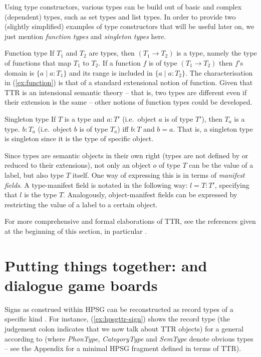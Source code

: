 \documentclass[output=paper
	        ,collection
	        ,collectionchapter
 	        ,biblatex
                ,babelshorthands
                ,newtxmath
                ,draftmode
                ,colorlinks, citecolor=brown
]{langscibook}
\begin{document}
Using type constructors, various types can be build out of basic and complex (dependent) types, such as set types and list types. 
%
In order to provide two (slightly simplified) examples of type constructors that will be useful later on, we just mention \emph{function types}  and \emph{singleton types}  here.

\ea Function type \label{ex:function}
\ea If $T_1$ and $T_2$ are types, then $(T_1 \rightarrow T_2)$ is a type, namely the type of functions that map $T_1$ to $T_2$.
\ex If a function $f$ is of type $(T_1 \rightarrow T_2)$ then $f$'s domain is $\{a \mid a : T_1\}$ and its range is included in $\{a \mid a : T_2\}$.
\z
\z 
%
The characterisation in (\ref{ex:function}) is that of a standard extensional notion of function. 
%
Given that TTR is an intensional semantic theory -- that is, two types are different even if their extension is the same -- other notions of function types could be developed.


\ea Singleton type
\ea If $T$ is a type and $a : T'$ (i.e.\ object $a$ is of type $T'$), then $T_a$ is a type.
\ex $b : T_a$ (i.e.\ object $b$ is of type $T_a$) iff $b : T$ and $b = a$.
\z
\z
%
That is, a singleton type is singleton since it is the type of specific object. 

Since types are semantic objects in their own right (types are not defined by or reduced to their extensions), not only an object $o$ of type $T$ can be the value of a label, but also  type $T$ itself.
%
One way of expressing this is in terms of 
\emph{manifest fields}. 
%
A type-manifest field is notated in the following way: $l=T : T'$, specifying that $l$ is the type $T$.
%
Analogously, object-manifest fields can be expressed by restricting the value of a label to a certain object.


For more comprehensive and formal elaborations of TTR, see the references given at the beginning of this section, in particular \citet{Cooper:ms}.
  



 
\section{Putting things together: \HPSGTTR and dialogue game boards}
\label{sec:hpsgttr-dialogue-game-boards}

Signs as construed within HPSG can be reconstructed as record types of a specific kind \citep{Cooper:2008}.
%
For instance, (\ref{ex:hpsgttr-sign}) shows the record type (the judgement colon indicates that we now talk about TTR objects) for a general  according to \citet{Pollard:Sag:1994} (where \emph{PhonType}, \emph{CategoryType} and \emph{SemType} denote obvious types -- see the Appendix for a minimal HPSG fragment defined in terms of TTR).
%
\ea \label{ex:hpsgttr-sign}
\z
\end{document}
